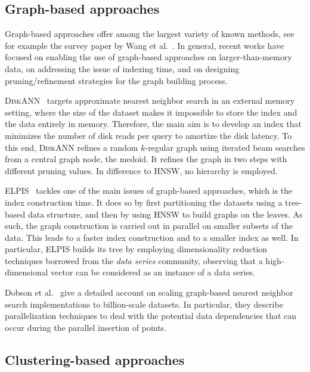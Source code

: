 \documentclass[11pt]{article}
\begin{document}
\subsection{Graph-based approaches}

Graph-based approaches offer among the largest variety of known methods, see
for example the survey paper by Wang et
al.~\cite{DBLP:journals/pvldb/WangXY021}. In general, recent works have focused
on enabling the use of graph-based approaches on larger-than-memory data,
on addressing the issue of indexing time, and on designing pruning/refinement strategies for the graph building process.

\textsc{DiskANN~\cite{DBLP:conf/nips/SubramanyaDSKK19}}
targets approximate nearest neighbor search in an external memory setting,
where the size of the dataset makes it impossible to store the index and the
data entirely in memory.
Therefore, the main aim is to develop an index that minimizes the number of
disk reads per query to amortize the disk latency.
To this end, \textsc{DiskANN} refines a random
$k$-regular graph using iterated beam searches from a central graph node,
the medoid. It refines the graph in two steps with different pruning
values. In difference to HNSW, no hierarchy is employed.

\textsc{ELPIS}~\cite{DBLP:journals/pvldb/AziziEP23} tackles one of the main
issues of graph-based approaches, which is the index construction time. It
does so by first partitioning the datasets using a tree-based data
structure, and then by using HNSW to build graphs on the leaves. As such,
the graph construction is carried out in parallel on smaller subsets of the
data. This leads to a faster index construction and to a smaller index as
well.
In particular, \textsc{ELPIS} builds its tree by employing dimensionality
reduction techniques borrowed from the \emph{data series} community,
observing that a high-dimensional vector can be considered as an instance of
a data series.

Dobson et al.~\cite{DBLP:journals/corr/abs-2305-04359} give a detailed account on scaling graph-based nearest neighbor search implementations to billion-scale datasets.
In particular, they describe parallelization techniques to deal with the potential data dependencies that can occur during the parallel insertion of points.


\subsection{Clustering-based approaches}
\end{document}
